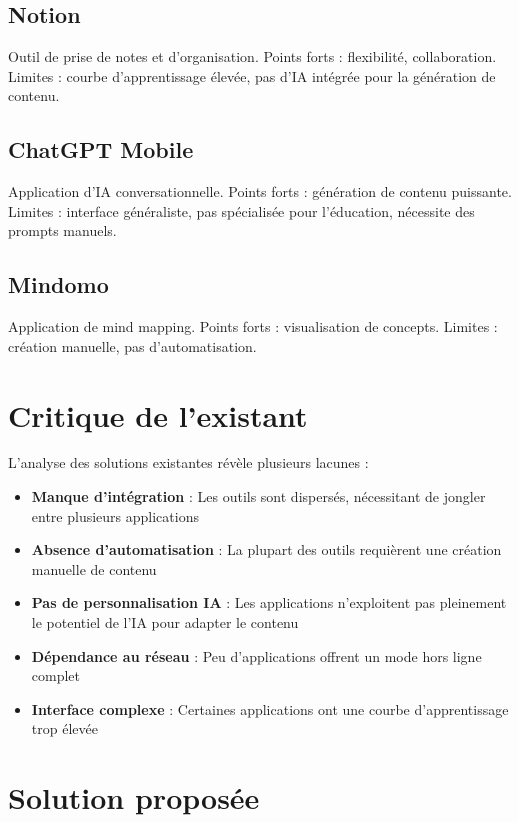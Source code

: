 \documentclass[12pt,a4paper]{report}
\begin{document}
\subsection{Notion}
Outil de prise de notes et d'organisation. Points forts : flexibilité, collaboration. Limites : courbe d'apprentissage élevée, pas d'IA intégrée pour la génération de contenu.

\subsection{ChatGPT Mobile}
Application d'IA conversationnelle. Points forts : génération de contenu puissante. Limites : interface généraliste, pas spécialisée pour l'éducation, nécessite des prompts manuels.

\subsection{Mindomo}
Application de mind mapping. Points forts : visualisation de concepts. Limites : création manuelle, pas d'automatisation.

\section{Critique de l'existant}

L'analyse des solutions existantes révèle plusieurs lacunes :

\begin{itemize}
    \item \textbf{Manque d'intégration} : Les outils sont dispersés, nécessitant de jongler entre plusieurs applications
    \item \textbf{Absence d'automatisation} : La plupart des outils requièrent une création manuelle de contenu
    \item \textbf{Pas de personnalisation IA} : Les applications n'exploitent pas pleinement le potentiel de l'IA pour adapter le contenu
    \item \textbf{Dépendance au réseau} : Peu d'applications offrent un mode hors ligne complet
    \item \textbf{Interface complexe} : Certaines applications ont une courbe d'apprentissage trop élevée
\end{itemize}

\section{Solution proposée}
\end{document}
